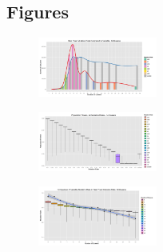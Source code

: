 \documentclass{sig-alternate}
\begin{document}
\subsection{Figures}
\begin{figure}[h]
\centering
\includegraphics[width=0.35\textwidth]{best_solution_all_queens.png}
\vspace{-12pt}
\caption{}
\label{fig:best_solution_all_queens}
\end{figure}

\begin{figure}[h]
\centering
\includegraphics[width=0.35\textwidth]{fitness_all_mutation_14q.png}
\vspace{-12pt}
\caption{}
\label{fig:fitness_all_mutation_14}
\end{figure}


\begin{figure}[h]
\centering
\includegraphics[width=0.35\textwidth]{mutation_rate_all_queens.png}
\vspace{-12pt}
\caption{}
\label{fig:mutation_rate_all_queens}
\end{figure}
\end{document}
